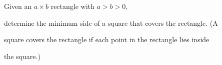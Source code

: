 Given an $ a \times b$ rectangle with $ a > b > 0,$

 determine the minimum side of a square that covers the rectangle. (A 

square covers the rectangle if each point in the rectangle lies inside 

the square.)